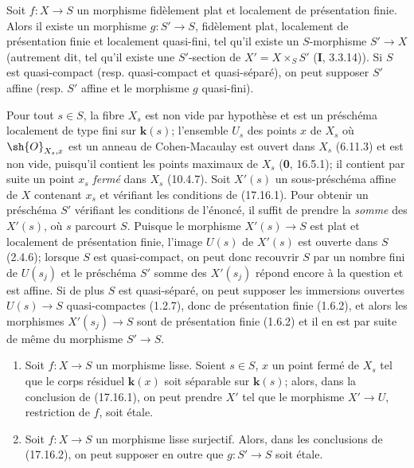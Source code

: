 \begin{corollary}[17.16.2]
\label{IV.17.16.2}
Soit $f:X\to S$ un morphisme fidèlement plat et localement de présentation finie. Alors il existe un morphisme $g:S'\to S$, fidèlement plat, localement de présentation finie et \textup{localement quasi-fini}, tel qu'il existe un $S$-morphisme $S'\to X$ \textup{(autrement dit, tel qu'il existe une} $S'$-section \textup{de} $X'=X\times_S S'$ \textup{(\textbf{I}, 3.3.14))}. Si $S$ est quasi-compact \textup{(resp.} quasi-compact et quasi-séparé\textup{)}, on peut supposer $S'$ affine \textup{(resp.} $S'$ affine et le morphisme $g$ quasi-fini\textup{)}.
\end{corollary}

Pour tout $s\in S$, la fibre $X_s$ est non vide par hypothèse et est un préschéma localement de type fini sur $\boldsymbol{k}(s)$; l'ensemble $U_s$ des points $x$ de $X_s$ où $\sh{O}_{X_s,x}$ est un anneau de Cohen-Macaulay est ouvert dans $X_s$ (6.11.3) et est non vide, puisqu'il contient les points maximaux de $X_s$ (\textbf{0}, 16.5.1); il contient par suite un point $x_s$ \emph{fermé} dans $X_s$ (10.4.7). Soit $X'(s)$ un sous-préschéma affine de $X$ contenant $x_s$ et vérifiant les conditions de (17.16.1). Pour obtenir un préschéma $S'$ vérifiant les conditions de l'énoncé, il suffit de prendre la \emph{somme} des $X'(s)$, où $s$ parcourt $S$. Puisque le morphisme $X'(s)\to S$ est plat et localement de présentation finie, l'image $U(s)$ de $X'(s)$ est ouverte dans $S$ (2.4.6); lorsque $S$ est quasi-compact, on peut donc recouvrir $S$ par un nombre fini de $U(s_j)$ et le préschéma $S'$ somme des $X'(s_j)$ répond encore à la question et est affine. Si de plus $S$ est quasi-séparé, on peut supposer les immersions ouvertes $U(s)\to S$ quasi-compactes (1.2.7), donc de présentation finie (1.6.2), et alors les morphismes $X'(s_j)\to S$ sont de présentation finie (1.6.2) et il en est par suite de même du morphisme $S'\to S$.

\begin{corollary}[17.16.3]
\label{IV.17.16.3}
\begin{enumerate}
  \item[\textup{(i)}] Soit $f:X\to S$ un morphisme lisse. Soient $s\in S$, $x$ un point fermé de $X_s$ tel que le corps résiduel $\boldsymbol{k}(x)$ soit séparable sur $\boldsymbol{k}(s)$; alors, dans la conclusion de \textup{(17.16.1)}, on peut prendre $X'$ tel que le morphisme $X'\to U$, restriction de $f$, soit étale.
  \item[\textup{(ii)}] Soit $f:X\to S$ un morphisme lisse surjectif. Alors, dans les conclusions de \textup{(17.16.2)}, on peut supposer en outre que $g:S'\to S$ soit étale.
\end{enumerate}
\end{corollary}

